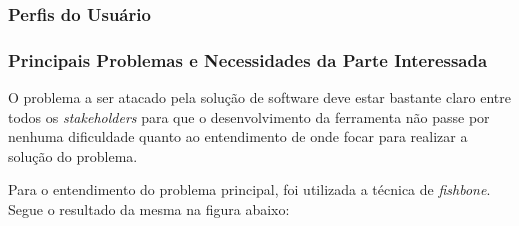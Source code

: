 \subsubsection{Perfis do Usuário}

\subsubsection{Principais Problemas e Necessidades da Parte Interessada}

O problema a ser atacado pela solução de software deve estar bastante claro entre todos os \textit{stakeholders} para que o desenvolvimento da ferramenta não passe por nenhuma dificuldade quanto ao entendimento de onde focar para realizar a solução do problema.

Para o entendimento do problema principal, foi utilizada a técnica de \textit{fishbone}. Segue o resultado da mesma na figura abaixo:

